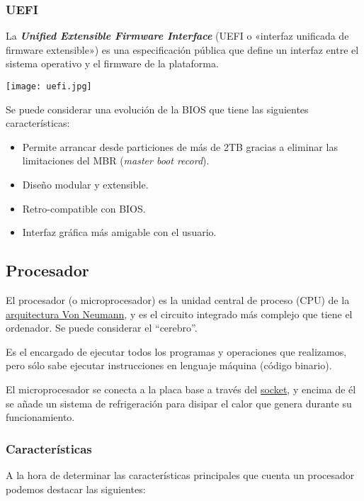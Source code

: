\subsubsection{UEFI}
La \textit{\textbf{Unified Extensible Firmware Interface}} (UEFI o «interfaz unificada de firmware extensible») es una especificación pública que define un interfaz entre el sistema operativo y el firmware de la plataforma.


\begin{center}
    \texttt{[image: uefi.jpg]}
\end{center}

Se puede considerar una evolución de la BIOS  que tiene las siguientes características:

\begin{itemize}
    \item Permite arrancar desde particiones de más de 2TB gracias a eliminar las limitaciones del MBR (\textit{master boot record}).
    \item Diseño modular y extensible.
    \item Retro-compatible con BIOS.
    \item Interfaz gráfica más amigable con el usuario.
\end{itemize}


\subsection{Procesador}
El procesador (o microprocesador) es la unidad central de proceso (CPU) de la \hyperlink{von_neumann}{arquitectura Von Neumann}, y es el  circuito integrado más complejo que tiene el ordenador. Se puede considerar el “cerebro”.

Es el encargado de ejecutar todos los programas y operaciones que realizamos, pero sólo sabe ejecutar instrucciones en lenguaje máquina (código binario).

El microprocesador se conecta a la placa base a través del \hyperlink{socket}{socket}, y encima de él se añade un sistema de refrigeración para disipar el calor que genera durante su funcionamiento.


\subsubsection{Características}
A la hora de determinar las características principales que cuenta un procesador podemos destacar las siguientes:

